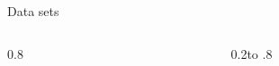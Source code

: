 \documentclass[aspectratio=169]{beamer}
\begin{document}
\begin{frame}{Data sets}
\begin{columns}[T]
\begin{column}{0.8\textwidth}
{\begin{tabular}{c c c c}
        \end{tabular}
    \vfill}\end{column}
    \begin{column}{0.2\textwidth}\vbox to .8\end{column}
    \end{columns}
\end{frame}
\end{document}
